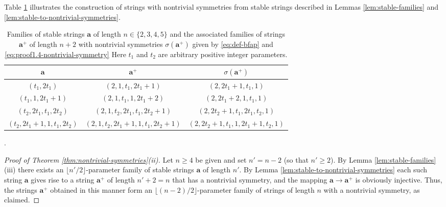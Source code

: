 \documentclass[10pt]{article}
\theoremstyle{definition}
\numberwithin{equation}{section}
\numberwithin{lemma}{section}
\newcommand{\bfa}{\mathbf{a}}
\newcommand{\bfap}{\bfa^+}
\begin{document}
Table \ref{table:families-with-nontrivial-symmetries}
illustrates the construction of strings with nontrivial symmetries from
stable strings  described in Lemmas \ref{lem:stable-families} and
\ref{lem:stable-to-nontrivial-symmetries}. 



\begin{table}[H]
\begin{center}
\addtolength{\tabcolsep}{-3pt}
\renewcommand{\arraystretch}{1.5}
\begin{tabular}{|c|c|c|}
\hline
$\bfa$ & $\bfap$ & $\sigma(\bfap)$
\\
\hline
$(t_1,2t_1)$ & $(2,1,t_1,2t_1+1)$ & $(2,2t_1+1,t_1,1)$ 
\\
$(t_1,1, 2t_1+1)$ & $(2,1,t_1,1,2t_1+2)$ & $(2,2t_1+2,1,t_1, 1)$ 
\\
$(t_2,2t_1, t_1, 2t_2)$ & 
$(2,1,t_2,2t_1,t_1,2t_2+1)$ &
$(2,2t_2+1, t_1, 2t_1, t_2, 1)$
\\
$(t_2,2t_1+1,1,t_1,2t_2)$ &
$(2,1,t_2,2t_1+1,1,t_1,2t_2+1)$ &
$(2,2t_2+1,t_1, 1, 2t_1+1, t_2, 1)$ 
\\
\hline
\end{tabular}
\caption{Families of stable strings $\bfa$ of length $n\in\{2,3,4,5\}$ and the
associated families of strings $\bfap$ of length $n+2$ 
with nontrivial symmetries
$\sigma(\bfap)$ given by \eqref{eq:def-bfap}
and \eqref{eq:proof1.4-nontrivial-symmetry}
Here $t_1$ and $t_2$ are
arbitrary positive integer parameters.}
\label{table:families-with-nontrivial-symmetries}. 
\end{center}
\end{table}

\begin{proof}[Proof of Theorem \ref{thm:nontrivial-symmetries}(ii)]
Let $n\ge 4$ be given and set $n'=n-2$ (so that $n'\ge 2$). By Lemma
\ref{lem:stable-families}(iii) there exists an $\lfloor n'/2\rfloor$-parameter
family of stable strings $\bfa$ of length $n'$. By Lemma
\ref{lem:stable-to-nontrivial-symmetries} each such string $\bfa$ gives
rise to a string $\bfap$ of length $n'+2=n$ that has a nontrivial
symmetry, and the mapping $\bfa\to \bfap$ is obviously injective. Thus, the
strings $\bfap$ obtained in this manner form 
an $\lfloor (n-2)/2\rfloor$-parameter family of strings of length $n$ 
with a nontrivial symmetry, as claimed.
\end{proof}
\end{document}
